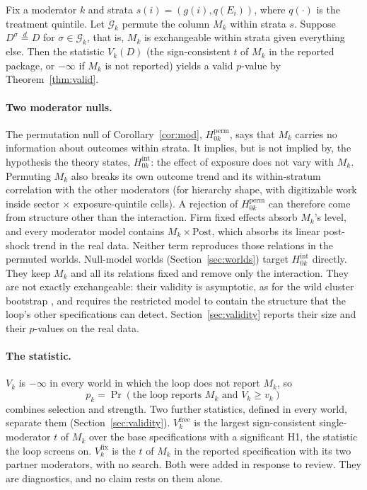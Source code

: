 \documentclass[11pt]{article}
\theoremstyle{remark}\newtheorem{remark}{Remark}
\begin{document}
\begin{corollary}\label{cor:mod}
Fix a moderator $k$ and strata $s(i)=(g(i),q(E_i))$, where $q(\cdot)$ is the treatment quintile. Let $\mathcal G_k$ permute
the column $M_k$ within strata $s$. Suppose $D^{\sigma}\overset{d}{=}D$ for $\sigma\in\mathcal G_k$, that is, $M_k$ is
exchangeable within strata given everything else. Then the statistic $V_k(D)$ (the sign-consistent $t$ of $M_k$ in the
reported package, or $-\infty$ if $M_k$ is not reported) yields a valid $p$-value by Theorem~\ref{thm:valid}.
\end{corollary}

\paragraph{Two moderator nulls.} The permutation null of Corollary~\ref{cor:mod}, $H_{0k}^{\text{perm}}$, says that $M_k$
carries no information about outcomes within strata. It implies, but is not implied by, the hypothesis the theory states,
$H_{0k}^{\text{int}}$: the effect of exposure does not vary with $M_k$. Permuting $M_k$ also breaks its own outcome trend and its
within-stratum correlation with the other moderators (for hierarchy shape, \VcorrPyrRemCell with digitizable work inside sector
$\times$ exposure-quintile cells). A rejection of $H_{0k}^{\text{perm}}$ can therefore come from structure other than the
interaction. Firm fixed effects absorb $M_k$'s level, and every moderator model contains $M_k\times\text{Post}$, which
absorbs its linear post-shock trend in the real data. Neither term reproduces those relations in the permuted worlds.
Null-model worlds (Section~\ref{sec:worlds}) target $H_{0k}^{\text{int}}$ directly. They keep $M_k$ and all its relations
fixed and remove only the interaction. They are not exactly exchangeable: their validity is asymptotic, as for the wild
cluster bootstrap \citep{cameron2008bootstrap}, and requires the restricted model to contain the structure that the loop's
other specifications can detect. Section~\ref{sec:validity} reports their size and their $p$-values on the real data.

\paragraph{The statistic.} $V_k$ is $-\infty$ in every world in which the loop does not report $M_k$, so
\[
p_k=\Pr(\text{the loop reports }M_k\text{ and }V_k\ge v_k)
\]
combines selection and strength. Two further statistics, defined
in every world, separate them (Section~\ref{sec:validity}). $V_k^{\text{free}}$ is the largest sign-consistent
single-moderator $t$ of $M_k$ over the base specifications with a significant H1, the statistic the loop screens on.
$V_k^{\text{fix}}$ is the $t$ of $M_k$ in the reported specification with its two partner moderators, with no search. Both were
added in response to review. They are diagnostics, and no claim rests on them alone.
\end{document}
